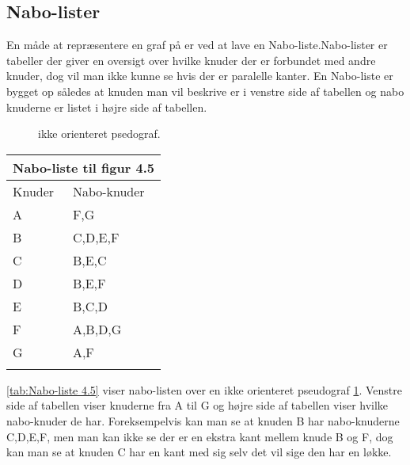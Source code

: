 \subsection{Nabo-lister}
En måde at repræsentere en graf på er ved at lave en Nabo-liste.Nabo-lister er tabeller der giver en oversigt over hvilke knuder der er forbundet med andre knuder, dog vil man ikke kunne se hvis der er paralelle kanter. En Nabo-liste er bygget op således at knuden man vil beskrive er i venstre side af tabellen og nabo knuderne er listet i højre side af tabellen. \\

\begin{figure}[h]
  \centering
  \caption{ikke orienteret psedograf\citep{dmat}.}
  \label{fig:4.5}
\end{figure}

\begin{center}
	\begin{tabular}{ |p{4cm}||p{3cm}|}
	 	\hline
 		\multicolumn{2}{|c|}{Nabo-liste til figur 4.5} \\
 		\hline
 		Knuder & Nabo-knuder\\
 		\hline
 		A & F,G \\
		B & C,D,E,F \\
		C & B,E,C \\
		D & B,E,F \\
		E & B,C,D \\
		F & A,B,D,G \\
		G & A,F \\
 	\hline
 	\label{tab:Nabo-liste 4.5}
	\end{tabular}
\end{center}
\ref{tab:Nabo-liste 4.5} viser nabo-listen over en ikke orienteret pseudograf \ref{fig:4.5}. Venstre side af tabellen viser knuderne fra A til G og højre side af tabellen viser hvilke nabo-knuder de har. Foreksempelvis kan man se at knuden B har nabo-knuderne C,D,E,F, men man kan ikke se der er en ekstra kant mellem knude B og F, dog kan man se at knuden C har en kant med sig selv det vil sige den har en løkke.

